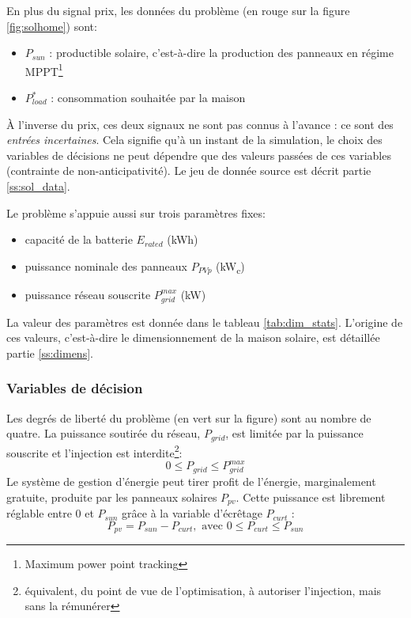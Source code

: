 \documentclass[a4paper,10pt,twocolumn]{article}
\newcommand\sub[1]{\textsubscript{#1}}
\newcommand\kWc{kW\sub{c}{}} %
\begin{document}
En plus du signal prix, les données du problème (en rouge sur la figure \ref{fig:solhome}) sont:

\begin{itemize}
 \item $P_{sun}$ : productible solaire, c'est-à-dire la production des panneaux en régime
MPPT\footnote{Maximum power point tracking}
 \item $P_{load}^*$ : consommation souhaitée par la maison
\end{itemize}

À l'inverse du prix, ces deux signaux ne sont pas connus à l'avance :
ce sont des \emph{entrées incertaines}.
Cela signifie qu'à un instant de la simulation, le choix des variables
de décisions ne peut dépendre que des valeurs passées de ces variables
(contrainte de non-anticipativité).
Le jeu de donnée source est décrit partie \ref{ss:sol_data}.

Le problème s'appuie aussi sur trois paramètres fixes:
\begin{itemize}
 \item capacité de la batterie $E_{rated}$ (kWh)
 \item puissance nominale des panneaux $P_{PVp}$ (\kWc)
 \item puissance réseau souscrite $P_{grid}^{max}$ (kW)
\end{itemize}

La valeur des paramètres est donnée dans le tableau \ref{tab:dim_stats}.
L'origine de ces valeurs, c'est-à-dire le dimensionnement de la maison solaire,
est détaillée partie \ref{ss:dimens}.

\subsubsection{Variables de décision}
\label{sss:opti_var}

Les degrés de liberté du problème (en vert sur la figure) sont au nombre de quatre.
La puissance soutirée du réseau, $P_{grid}$,
est limitée par la puissance souscrite
et l'injection est interdite\footnote{
équivalent, du point de vue de l'optimisation, à autoriser l'injection, mais sans la rémunérer}:
%
\begin{equation}
  0 \leq P_{grid} \leq P_{grid}^{max}
\end{equation}
%
Le système de gestion d'énergie peut tirer profit de l'énergie, marginalement
gratuite, produite par les panneaux solaires $P_{pv}$.
Cette puissance est librement réglable entre 0 et $P_{sun}$ grâce à la variable
d'écrêtage $P_{curt}$ :
%
\begin{equation}
  P_{pv} = P_{sun} - P_{curt}, \text{ avec } 0 \leq P_{curt} \leq P_{sun}
\end{equation}
\end{document}
